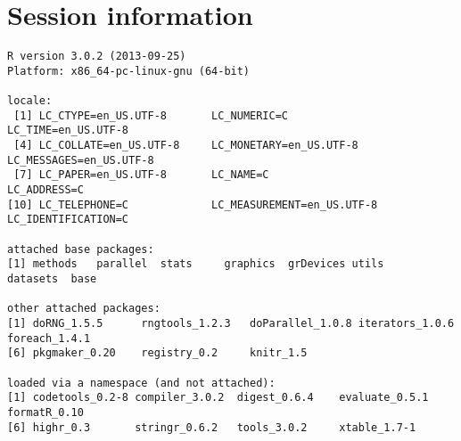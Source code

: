 \documentclass[a4paper,12pt]{article}\usepackage[]{graphicx}\usepackage[]{color}
\makeatletter
\newenvironment{kframe}{%
 \def\at@end@of@kframe{}%
 \ifinner\ifhmode%
  \def\at@end@of@kframe{\end{minipage}}%
  \begin{minipage}{\columnwidth}%
 \fi\fi%
 \def\FrameCommand##1{\hskip\@totalleftmargin \hskip-\fboxsep
 \colorbox{shadecolor}{##1}\hskip-\fboxsep
     \hskip-\linewidth \hskip-\@totalleftmargin \hskip\columnwidth}%
 \MakeFramed {\advance\hsize-\width
   \@totalleftmargin\z@ \linewidth\hsize
   \@setminipage}}%
 {\par\unskip\endMakeFramed%
 \at@end@of@kframe}
\newenvironment{knitrout}{}{} %
\makeatother
\begin{document}
\section*{Session information}
\begin{knitrout}\footnotesize
{}\color{fgcolor}\begin{kframe}
\begin{verbatim}
R version 3.0.2 (2013-09-25)
Platform: x86_64-pc-linux-gnu (64-bit)

locale:
 [1] LC_CTYPE=en_US.UTF-8       LC_NUMERIC=C               LC_TIME=en_US.UTF-8       
 [4] LC_COLLATE=en_US.UTF-8     LC_MONETARY=en_US.UTF-8    LC_MESSAGES=en_US.UTF-8   
 [7] LC_PAPER=en_US.UTF-8       LC_NAME=C                  LC_ADDRESS=C              
[10] LC_TELEPHONE=C             LC_MEASUREMENT=en_US.UTF-8 LC_IDENTIFICATION=C       

attached base packages:
[1] methods   parallel  stats     graphics  grDevices utils     datasets  base     

other attached packages:
[1] doRNG_1.5.5      rngtools_1.2.3   doParallel_1.0.8 iterators_1.0.6  foreach_1.4.1   
[6] pkgmaker_0.20    registry_0.2     knitr_1.5       

loaded via a namespace (and not attached):
[1] codetools_0.2-8 compiler_3.0.2  digest_0.6.4    evaluate_0.5.1  formatR_0.10   
[6] highr_0.3       stringr_0.6.2   tools_3.0.2     xtable_1.7-1   
\end{verbatim}
\end{kframe}
\end{knitrout}


\printbibliography[heading=bibintoc]
\end{document}

